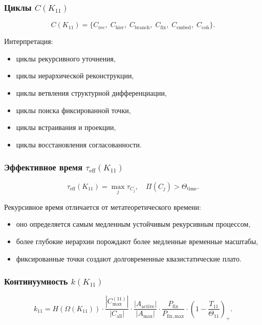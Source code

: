 \subsubsection{Циклы $C(K_{11})$}

\[
C(K_{11})=
\{
C_{\mathrm{rec}},\;
C_{\mathrm{hier}},\;
C_{\mathrm{branch}},\;
C_{\mathrm{fix}},\;
C_{\mathrm{embed}},\;
C_{\mathrm{coh}}
\}.
\]

Интерпретация:
\begin{itemize}
    \item циклы рекурсивного уточнения,
    \item циклы иерархической реконструкции,
    \item циклы ветвления структурной дифференциации,
    \item циклы поиска фиксированной точки,
    \item циклы встраивания и проекции,
    \item циклы восстановления согласованности.
\end{itemize}

\subsubsection{Эффективное время $\tau_{\mathrm{eff}}(K_{11})$}

\[
\tau_{\mathrm{eff}}(K_{11})
=
\max_j \tau_{C_j},
\quad
\Pi(C_j)>\Theta_{\mathrm{time}}.
\]

Рекурсивное время отличается от метатеоретического времени:
\begin{itemize}
    \item оно определяется самым медленным устойчивым рекурсивным процессом,
    \item более глубокие иерархии порождают более медленные временные масштабы,
    \item фиксированные точки создают долговременные квазистатические плато.
\end{itemize}

\subsubsection{Континуумность $k(K_{11})$}

\[
k_{11}=
H(\Omega(K_{11}))
\cdot
\frac{|C_{\max}^{(11)}|}{|C_{\mathrm{all}}|}
\cdot
\frac{|A_{\mathrm{active}}|}{|A_{\max}|}
\cdot
\frac{P_{\mathrm{fix}}}{P_{\mathrm{fix,max}}}
\cdot
\left(1-\frac{T_{11}}{\Theta_{11}}\right)_+.
\]

